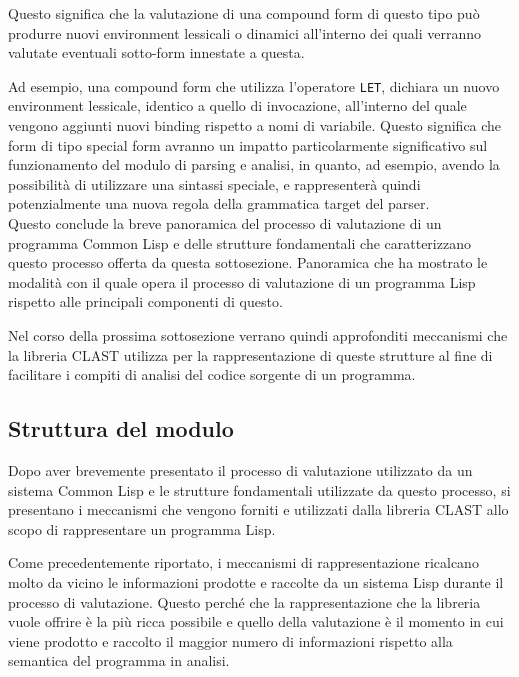 Questo significa che la valutazione di una compound form di questo tipo può
produrre nuovi environment lessicali o dinamici all’interno dei quali verranno
valutate eventuali sotto-form innestate a questa.

Ad esempio, una compound form che utilizza l’operatore \texttt{LET}, dichiara un
nuovo environment lessicale, identico a quello di invocazione, all’interno del
quale vengono aggiunti nuovi binding rispetto a nomi di variabile. Questo
significa che form di tipo special form avranno un impatto particolarmente
significativo sul funzionamento del modulo di parsing e analisi, in quanto, ad
esempio, avendo la possibilità di utilizzare una sintassi speciale, e
rappresenterà quindi potenzialmente una nuova regola della grammatica target del
parser.\\

Questo conclude la breve panoramica del processo di valutazione di un programma
Common Lisp e delle strutture fondamentali che caratterizzano questo processo
offerta da questa sottosezione. Panoramica che ha mostrato le modalità con il
quale opera il processo di valutazione di un programma Lisp rispetto alle
principali componenti di questo.

Nel corso della prossima sottosezione verrano quindi approfonditi meccanismi che
la libreria CLAST utilizza per la rappresentazione di queste strutture al fine
di facilitare i compiti di analisi del codice sorgente di un programma.

\subsection{Struttura del modulo}

Dopo aver brevemente presentato il processo di valutazione utilizzato da un
sistema Common Lisp e le strutture fondamentali utilizzate da questo processo,
si presentano i meccanismi che vengono forniti e utilizzati dalla libreria CLAST
allo scopo di rappresentare un programma Lisp.

Come precedentemente riportato, i meccanismi di rappresentazione ricalcano
molto da vicino le informazioni prodotte e raccolte da un sistema Lisp durante
il processo di valutazione. Questo perché che la rappresentazione che la
libreria vuole offrire è la più ricca possibile e quello della valutazione è
il momento in cui viene prodotto e raccolto il maggior numero di informazioni
rispetto alla semantica del programma in analisi.\\

